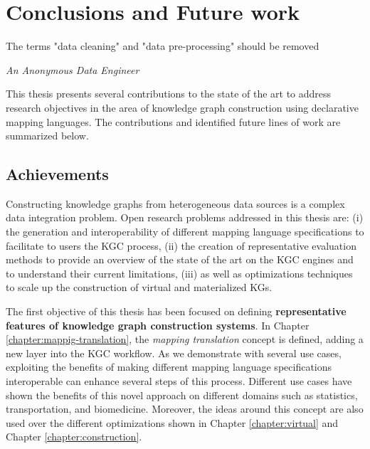 \chapter{Conclusions and Future work}
\label{chap:conc}

\epigraph{The terms "data cleaning" and "data pre-processing" should be removed}{\textit{An Anonymous Data Engineer}}

This thesis presents several contributions to the state of the art to address research objectives in the area of knowledge graph construction using declarative mapping languages. The contributions and identified future lines of work are summarized below.


\section{Achievements}
Constructing knowledge graphs from heterogeneous data sources is a complex data integration problem. Open research problems addressed in this thesis are: (i) the generation and interoperability of different mapping language specifications to facilitate to users the KGC process, (ii) the creation of representative evaluation methods to provide an overview of the state of the art on the KGC engines and to understand their current limitations, (iii) as well as optimizations techniques to scale up the construction of virtual and materialized KGs. 
 
 
The first objective of this thesis has been focused on defining \textbf{representative features of knowledge graph construction systems}. In Chapter \ref{chapter:mappig-translation}, the \textit{mapping translation} concept is defined, adding a new layer into the KGC workflow. As we demonstrate with several use cases, exploiting the benefits of making different mapping language specifications interoperable can enhance several steps of this process. Different use cases have shown the benefits of this novel approach on different domains such as statistics, transportation, and biomedicine. Moreover, the ideas around this concept are also used over the different optimizations shown in Chapter \ref{chapter:virtual} and Chapter \ref{chapter:construction}.

